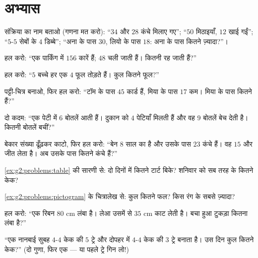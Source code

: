 \section{अभ्यास}

\begin{exercise}[$\star$]\label{exo:g2:problems:1}
संक्रिया का नाम बताओ (गणना मत करो): ``$34$ और $28$ कंचे मिलाए
गए''; ``$50$ मिठाइयाँ, $12$ खाई गईं''; ``$5$-$5$ सेबों के $4$
डिब्बे''; ``अना के पास $30$, लियो के पास $18$: अना के पास कितने ज़्यादा?''।
\end{exercise}

\begin{exercise}[$\star$]\label{exo:g2:problems:2}
हल करो: ``एक पार्किंग में $156$ कारें हैं; $48$ चली जाती हैं। कितनी रह जाती हैं?''
\end{exercise}

\begin{exercise}[$\star$]\label{exo:g2:problems:3}
हल करो: ``$5$ बच्चे हर एक $4$ फूल तोड़ते हैं। कुल कितने
फूल?''
\end{exercise}

\begin{exercise}[$\star$]\label{exo:g2:problems:4}
पट्टी-चित्र बनाओ, फिर हल करो: ``टॉम के पास $45$ कार्ड हैं, मिया
के पास $17$ कम। मिया के पास कितने हैं?''
\end{exercise}

\begin{exercise}[$\star$]\label{exo:g2:problems:5}
दो कदम: ``एक पेटी में $6$ बोतलें आती हैं। दुकान को $4$ पेटियाँ
मिलती हैं और वह $9$ बोतलें बेच देती है। कितनी बोतलें बचीं?''
\end{exercise}

\begin{exercise}[$\star$]\label{exo:g2:problems:6}
बेकार संख्या ढूँढ़कर काटो, फिर हल करो: ``बेन $8$ साल का है और
उसके पास $23$ कंचे हैं। वह $15$ और जीत लेता है। अब उसके पास
कितने कंचे हैं?''
\end{exercise}

\begin{exercise}[$\star$]\label{exo:g2:problems:7}
\cref{ex:g2:problems:table} की सारणी से: दो दिनों में कितने
टार्ट बिके? शनिवार को सब तरह के कितने केक?
\end{exercise}

\begin{exercise}[$\star$]\label{exo:g2:problems:8}
\cref{ex:g2:problems:pictogram} के चित्रालेख से: कुल कितने
फल? किस रंग के सबसे ज़्यादा?
\end{exercise}

\begin{exercise}[$\star$]\label{exo:g2:problems:9}
हल करो: ``एक रिबन $80$ cm लंबा है। लेआ उसमें से $35$ cm काट
लेती है। बचा हुआ टुकड़ा कितना लंबा है?''
\end{exercise}

\begin{exercise}[$\star\star$]\label{exo:g2:problems:10}
``एक नानबाई सुबह $4$-$4$ केक की $5$ ट्रे और दोपहर में $4$-$4$
केक की $3$ ट्रे बनाता है। उस दिन कुल कितने केक?'' (दो गुणा,
फिर एक  --- या पहले ट्रे गिन लो!)
\end{exercise}
